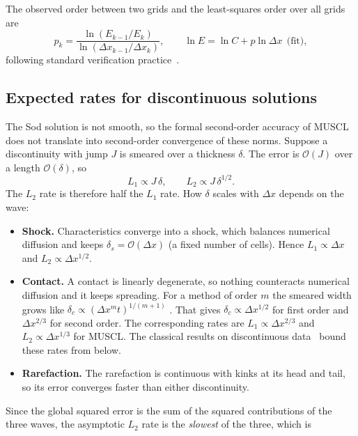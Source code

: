 \documentclass[11pt]{article}
\theoremstyle{remark}
\newcommand{\ord}{\mathcal{O}}
\begin{document}
The observed order between two grids and the least-squares order over all grids are
\begin{equation}
  p_{k} = \frac{\ln(E_{k-1}/E_{k})}{\ln(\Delta x_{k-1}/\Delta x_{k})},\qquad
  \ln E = \ln C + p\ln\Delta x\ \ \text{(fit)} ,
  \label{eq:order}
\end{equation}
following standard verification practice~\citep{Roache1998,OberkampfRoy2010}.

\subsection{Expected rates for discontinuous solutions}
\label{sec:expected_rates}
The Sod solution is not smooth, so the formal second-order accuracy of MUSCL does not
translate into second-order convergence of these norms.  Suppose a
discontinuity with jump $J$ is smeared over a thickness $\delta$.  The error is
$\ord(J)$ over a length $\ord(\delta)$, so
\begin{equation}
  L_1 \propto J\,\delta,\qquad L_2\propto J\,\delta^{1/2} .
  \label{eq:L1L2delta}
\end{equation}
The $L_2$ rate is therefore half the $L_1$ rate.  How $\delta$ scales with $\Delta x$
depends on the wave:
\begin{itemize}
\item \textbf{Shock.}  Characteristics converge into a shock, which balances numerical
      diffusion and keeps $\delta_s = \ord(\Delta x)$ (a fixed number of cells).  Hence
      $L_1\propto\Delta x$ and $L_2\propto\Delta x^{1/2}$.
\item \textbf{Contact.}  A contact is linearly degenerate, so nothing counteracts
      numerical diffusion and it keeps spreading.  For a method of order $m$ the
      smeared width grows like $\delta_c\propto(\Delta x^{m}t)^{1/(m+1)}$
      \citep{Harten1977,LeVeque2002}.  That gives $\delta_c\propto\Delta x^{1/2}$
      for first order and $\Delta x^{2/3}$ for second order.  The corresponding
      rates are $L_1\propto\Delta x^{2/3}$ and $L_2\propto\Delta x^{1/3}$ for MUSCL.
      The classical results on discontinuous data~\citep{Kuznetsov1976,BrennerThomeeWahlbin1975}
      bound these rates from below.
\item \textbf{Rarefaction.}  The rarefaction is continuous with kinks at its head and
      tail, so its error converges faster than either discontinuity.
\end{itemize}
Since the global squared error is the sum of the squared contributions of the
three waves, the asymptotic $L_2$ rate is the \emph{slowest} of the three, which is
\end{document}
